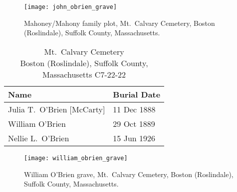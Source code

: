 \begin{figure}
	\centering
	\texttt{[image: john\_obrien\_grave]}
	\caption{Mahoney/Mahony family plot, Mt.\ Calvary Cemetery, Boston (Roslindale), Suffolk County, Massachusetts.}
	\label{fig:MahoneyPlot}
\end{figure}

\begin{table}[ht]
	\centering
	\caption{Mt.\ Calvary Cemetery\cite{William3OBrienBurial} \\
		Boston (Roslindale), Suffolk County, Massachusetts
		C7-22-22}
	\begin{tabular}{|l|l|}
		\hline
		\textbf{Name} & \textbf{Burial Date} \\
		\hline
		Julia T.\ O'Brien [McCarty]\index{McCarty!Julia T.}\index{O'Brien!Julia T.\ (McCarty)} & 11 Dec 1888 \\
		\hline
		William O'Brien\index{O'Brien!William\textsuperscript{3}} & 29 Oct 1889 \\
		\hline
		Nellie L.\ O'Brien\index{O'Brien!Ellen/Nellie Louise\textsuperscript{4}} & 15 Jun 1926 \\
		\hline
	\end{tabular}
\end{table}

\begin{figure}
	\centering
	\texttt{[image: william\_obrien\_grave]}
	\caption{William O'Brien grave, Mt.\ Calvary Cemetery, Boston (Roslindale), Suffolk County, Massachusetts.}
	\label{fig:WilliamOBrienGrave}
\end{figure}

